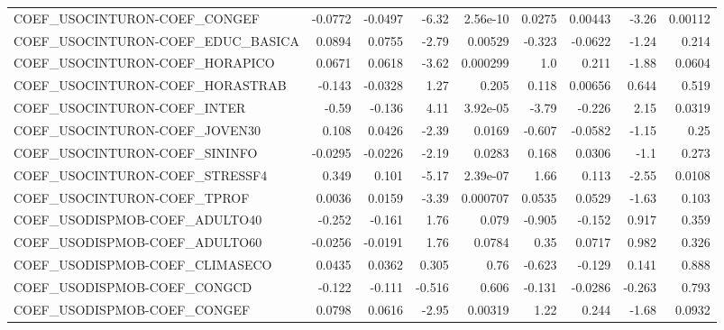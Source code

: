 \begin{tabular}{lrrrrrrrr}
COEF\_USOCINTURON-COEF\_CONGEF          &     -0.0772 &      -0.0497 &   -6.32 & 2.56e-10 &     0.0275 &     0.00443 &        -3.26 &       0.00112 \\
COEF\_USOCINTURON-COEF\_EDUC\_BASICA     &      0.0894 &       0.0755 &   -2.79 &  0.00529 &     -0.323 &     -0.0622 &        -1.24 &         0.214 \\
COEF\_USOCINTURON-COEF\_HORAPICO        &      0.0671 &       0.0618 &   -3.62 & 0.000299 &        1.0 &       0.211 &        -1.88 &        0.0604 \\
COEF\_USOCINTURON-COEF\_HORASTRAB       &      -0.143 &      -0.0328 &    1.27 &    0.205 &      0.118 &     0.00656 &        0.644 &         0.519 \\
COEF\_USOCINTURON-COEF\_INTER           &       -0.59 &       -0.136 &    4.11 & 3.92e-05 &      -3.79 &      -0.226 &         2.15 &        0.0319 \\
COEF\_USOCINTURON-COEF\_JOVEN30         &       0.108 &       0.0426 &   -2.39 &   0.0169 &     -0.607 &     -0.0582 &        -1.15 &          0.25 \\
COEF\_USOCINTURON-COEF\_SININFO         &     -0.0295 &      -0.0226 &   -2.19 &   0.0283 &      0.168 &      0.0306 &         -1.1 &         0.273 \\
COEF\_USOCINTURON-COEF\_STRESSF4        &       0.349 &        0.101 &   -5.17 & 2.39e-07 &       1.66 &       0.113 &        -2.55 &        0.0108 \\
COEF\_USOCINTURON-COEF\_TPROF           &      0.0036 &       0.0159 &   -3.39 & 0.000707 &     0.0535 &      0.0529 &        -1.63 &         0.103 \\
COEF\_USODISPMOB-COEF\_ADULTO40         &      -0.252 &       -0.161 &    1.76 &    0.079 &     -0.905 &      -0.152 &        0.917 &         0.359 \\
COEF\_USODISPMOB-COEF\_ADULTO60         &     -0.0256 &      -0.0191 &    1.76 &   0.0784 &       0.35 &      0.0717 &        0.982 &         0.326 \\
COEF\_USODISPMOB-COEF\_CLIMASECO        &      0.0435 &       0.0362 &   0.305 &     0.76 &     -0.623 &      -0.129 &        0.141 &         0.888 \\
COEF\_USODISPMOB-COEF\_CONGCD           &      -0.122 &       -0.111 &  -0.516 &    0.606 &     -0.131 &     -0.0286 &       -0.263 &         0.793 \\
COEF\_USODISPMOB-COEF\_CONGEF           &      0.0798 &       0.0616 &   -2.95 &  0.00319 &       1.22 &       0.244 &        -1.68 &        0.0932 \\

\end{tabular}

